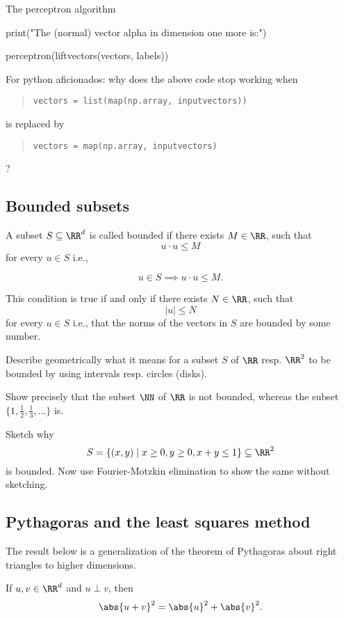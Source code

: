 \documentclass{article}
\begin{document}
\begin{hideinbutton}{The perceptron algorithm}
\begin{sage}
print("The (normal) vector alpha in dimension one more is:")
    
perceptron(liftvectors(vectors, labels))    
\end{sage}

\beginshex
For python aficionados: why does the above code stop working when
\begin{quote}
  \texttt{vectors = list(map(np.array, inputvectors))}
\end{quote}
is replaced by
\begin{quote}
  \texttt{vectors = map(np.array, inputvectors)}
\end{quote}
?
\endshex

\end{hideinbutton}

\subsection{Bounded subsets}

A subset $S \subseteq \RR^d$ is called bounded if there exists $M\in \RR$, such that
$$
u\cdot u\leq M
$$
for every $u\in S$ i.e.,
\begin{frameit}
  $$
  u\in S \implies u\cdot u\leq M.
  $$
\end{frameit}

This condition is true if and only if there exists $N\in \RR$, such
that
$$
|u|\leq N
$$
for every $u\in S$ i.e., that the norms of the vectors in $S$ are bounded by some
number.

\beginshex
Describe geometrically what it means for a subset $S$ of $\RR$ resp. $\RR^2$
to be bounded by using intervals resp. circles (disks).
\endshex

\beginshex
Show precisely that the subset $\NN$ of $\RR$ is not bounded, whereas the subset
$\{1, \frac{1}{2}, \frac{1}{3}, \dots\}$ is.
\endshex

\beginshex
Sketch why
$$
S = \{(x, y) \mid x\geq 0, y\geq 0, x + y\leq 1\}\subseteq \RR^2
$$
is bounded. Now use Fourier-Motzkin elimination to show the same
without sketching.
\endshex

\subsection{Pythagoras and the least squares method}

The result below is a generalization of the theorem of Pythagoras about right
triangles to higher dimensions.

\begin{proposition}\label{proppythagoras}
  If $u, v\in \RR^d$ and $u\perp v$, then
  $$
  \abs{u + v}^2 = \abs{u}^2 + \abs{v}^2.
  $$
\end{proposition}
\end{document}
